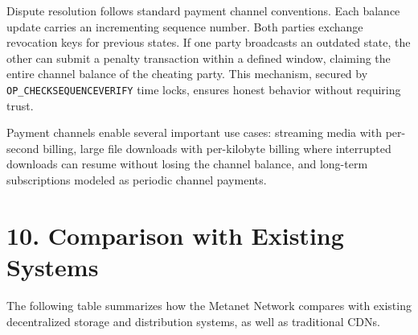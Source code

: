 \documentclass[11pt,a4paper]{article}
\begin{document}
Dispute resolution follows standard payment channel conventions. Each balance update carries an incrementing sequence number. Both parties exchange revocation keys for previous states. If one party broadcasts an outdated state, the other can submit a penalty transaction within a defined window, claiming the entire channel balance of the cheating party. This mechanism, secured by \texttt{OP\_CHECKSEQUENCEVERIFY} time locks, ensures honest behavior without requiring trust.

Payment channels enable several important use cases: streaming media with per-second billing, large file downloads with per-kilobyte billing where interrupted downloads can resume without losing the channel balance, and long-term subscriptions modeled as periodic channel payments.

\section{10. Comparison with Existing Systems}

The following table summarizes how the Metanet Network compares with existing decentralized storage and distribution systems, as well as traditional CDNs.
\end{document}
